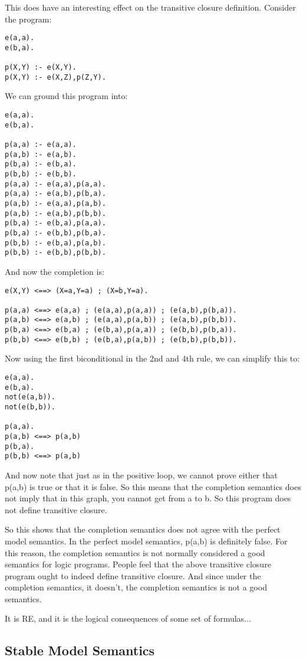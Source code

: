 This does have an interesting effect on the transitive closure
definition.  Consider the program:
\begin{verbatim}
e(a,a).
e(b,a).

p(X,Y) :- e(X,Y).
p(X,Y) :- e(X,Z),p(Z,Y).
\end{verbatim}
We can ground this program into:
\begin{verbatim}
e(a,a).
e(b,a).

p(a,a) :- e(a,a).
p(a,b) :- e(a,b).
p(b,a) :- e(b,a).
p(b,b) :- e(b,b).
p(a,a) :- e(a,a),p(a,a).
p(a,a) :- e(a,b),p(b,a).
p(a,b) :- e(a,a),p(a,b).
p(a,b) :- e(a,b),p(b,b).
p(b,a) :- e(b,a),p(a,a).
p(b,a) :- e(b,b),p(b,a).
p(b,b) :- e(b,a),p(a,b).
p(b,b) :- e(b,b),p(b,b).
\end{verbatim}
And now the completion is:
\begin{verbatim}
e(X,Y) <==> (X=a,Y=a) ; (X=b,Y=a).

p(a,a) <==> e(a,a) ; (e(a,a),p(a,a)) ; (e(a,b),p(b,a)).
p(a,b) <==> e(a,b) ; (e(a,a),p(a,b)) ; (e(a,b),p(b,b)).
p(b,a) <==> e(b,a) ; (e(b,a),p(a,a)) ; (e(b,b),p(b,a)).
p(b,b) <==> e(b,b) ; (e(b,a),p(a,b)) ; (e(b,b),p(b,b)).
\end{verbatim}
Now using the first biconditional in the 2nd and 4th rule, we can
simplify this to:
\begin{verbatim}
e(a,a).
e(b,a).
not(e(a,b)).
not(e(b,b)).

p(a,a).
p(a,b) <==> p(a,b)
p(b,a).
p(b,b) <==> p(a,b)
\end{verbatim}
And now note that just as in the positive loop, we cannot prove either
that p(a,b) is true or that it is false.  So this means that the
completion semantics does not imply that in this graph, you cannot get
from a to b.  So this program does not define transitive closure.

So this shows that the completion semantics does not agree with the
perfect model semantics.  In the perfect model semantics, p(a,b) is
definitely false.  For this reason, the completion semantics is not
normally considered a good semantics for logic programs.  People feel
that the above transitive closure program ought to indeed define
transitive closure.  And since under the completion semantics, it
doesn't, the completion semantics is not a good semantics.

It is RE, and it is the logical consequences of some set of formulas...


\subsection{Stable Model Semantics}

